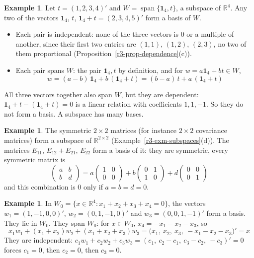 \documentclass[12pt]{article}
\newcommand{\R}{\mathbb R}
\newcommand{\one}{\mathbf 1}
\DeclareMathOperator{\Span}{span}
\theoremstyle{definition}
\newtheorem{example}[theorem]{Example}
\begin{document}
\begin{example}\label{r3-exm-two-of-three}
Let \(t=(1,2,3,4)'\) and \(W=\Span\{\one_4,t\}\), a subspace of \(\R^4\). Any two of the vectors
\(\one_4\), \(t\), \(\one_4+t=(2,3,4,5)'\) form a basis of \(W\).
\begin{itemize}
\item Each pair is independent: none of the three vectors is \(0\) or a multiple of another,
since their first two entries are \((1,1)\), \((1,2)\), \((2,3)\), no two of them proportional
(Proposition~\ref{r3-prop-dependence}(c)).
\item Each pair spans \(W\): the pair \(\one_4,t\) by definition, and for \(w=a\one_4+bt\in W\),
\[
w=(a-b)\,\one_4+b\,(\one_4+t)=(b-a)\,t+a\,(\one_4+t)
\]
\end{itemize}
All three vectors together also span \(W\), but they are dependent:
\(\one_4+t-(\one_4+t)=0\) is a linear relation with coefficients \(1,1,-1\). So they do not form
a basis. A subspace has many bases.
\end{example}

\begin{example}\label{r3-exm-symmetric-basis}
The symmetric \(2\times2\) matrices (for instance \(2\times2\) covariance matrices) form a
subspace of \(\R^{2\times2}\) (Example~\ref{r3-exm-subspaces}(d)). The matrices
\(E_{11}\), \(E_{12}+E_{21}\), \(E_{22}\) form a basis of it: they are symmetric, every
symmetric matrix is
\[
\begin{pmatrix}a&b\\b&d\end{pmatrix}=a\begin{pmatrix}1&0\\0&0\end{pmatrix}+b\begin{pmatrix}0&1\\1&0\end{pmatrix}+d\begin{pmatrix}0&0\\0&1\end{pmatrix}
\]
and this combination is \(0\) only if \(a=b=d=0\).
\end{example}

\begin{example}\label{r3-exm-centered-basis}
In \(W_0=\{x\in\R^4:x_1+x_2+x_3+x_4=0\}\), the vectors \(w_1=(1,-1,0,0)'\),
\(w_2=(0,1,-1,0)'\) and \(w_3=(0,0,1,-1)'\) form a basis. They lie in \(W_0\). They span
\(W_0\): for \(x\in W_0\), \(x_4=-x_1-x_2-x_3\), so
\[
x_1w_1+(x_1+x_2)w_2+(x_1+x_2+x_3)w_3=\bigl(x_1,\ x_2,\ x_3,\ -x_1-x_2-x_3\bigr)'=x
\]
They are independent: \(c_1w_1+c_2w_2+c_3w_3=(c_1,\ c_2-c_1,\ c_3-c_2,\ -c_3)'=0\) forces
\(c_1=0\), then \(c_2=0\), then \(c_3=0\).
\end{example}
\end{document}
